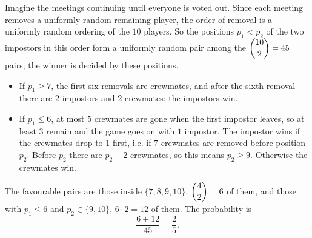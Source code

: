 Imagine the meetings continuing until everyone is voted out. Since each meeting removes a uniformly random remaining player, the order of removal is a uniformly random ordering of the $10$ players. So the positions $p_1<p_2$ of the two impostors in this order form a uniformly random pair among the $\dbinom{10}{2}=45$ pairs; the winner is decided by these positions.
\begin{itemize}
\item If $p_1\ge7$, the first six removals are crewmates, and after the sixth removal there are $2$ impostors and $2$ crewmates: the impostors win.
\item If $p_1\le6$, at most $5$ crewmates are gone when the first impostor leaves, so at least $3$ remain and the game goes on with $1$ impostor. The impostor wins if the crewmates drop to $1$ first, i.e. if $7$ crewmates are removed before position $p_2$. Before $p_2$ there are $p_2-2$ crewmates, so this means $p_2\ge9$. Otherwise the crewmates win.
\end{itemize}
The favourable pairs are those inside $\{7,8,9,10\}$, $\dbinom42=6$ of them, and those with $p_1\le6$ and $p_2\in\{9,10\}$, $6\cdot2=12$ of them. The probability is
\[\dfrac{6+12}{45}=\boxed{\dfrac25}.\]
